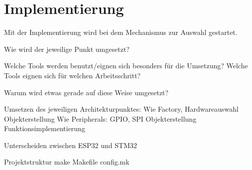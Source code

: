 \section{Implementierung}
Mit der Implementierung wird bei dem Mechanismus zur Auswahl gestartet.

Wie wird der jeweilige Punkt umgesetzt?

Welche Tools werden benutzt/eignen sich besonders für die Umsetzung?
Welche Tools eignen sich für welchen Arbeitsschritt?

Warum wird etwas gerade auf diese Weise umgesetzt?



Umsetzen des jeweiligen Architekturpunktes:
Wie Factory, 
Hardwareauswahl
Objekterstellung
Wie Peripherals: GPIO, SPI
Objekterstellung
Funktionsimplementierung

Unterscheiden zwischen ESP32 und STM32

Projektstruktur
make
Makefile
config.mk

